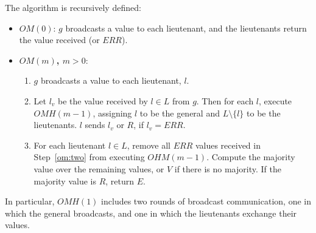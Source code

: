\documentclass{llncs/llncs}
\newcommand{\OM}[1]{\ensuremath{\mathrm{OM}(#1)}}
\begin{document}

The algorithm is recursively defined:

\begin{itemize}
\item {\bf $OM(0)$}: $g$ broadcasts a value to each lieutenant, and the lieutenants return the value received (or $ERR$).
\item {\bf $OM(m)$, $m > 0$}:
  \begin{enumerate}
  \item $g$ broadcasts a value to each lieutenant, $l$.
  \item\label{om:two} Let $l_v$ be the value received by $l \in L$ from $g$. Then for each $l$, execute $OMH(m-1)$, assigning $l$ to be the general and $L \setminus \{l\}$ to be the lieutenants. $l$ sends $l_v$ or $R$, if $l_v = ERR$.
  \item For each lieutenant $l \in L$, remove all $ERR$ values received in Step~\ref{om:two} from executing $OHM(m-1)$. Compute the majority value over the remaining values, or $V$ if there is no majority. If the majority value is $R$, return $E$.
  \end{enumerate}
\end{itemize}

\noindent
In particular, $OMH(1)$ includes two rounds of broadcast communication, one in which the general broadcasts, and one in which the lieutenants exchange their values.


\end{document}
